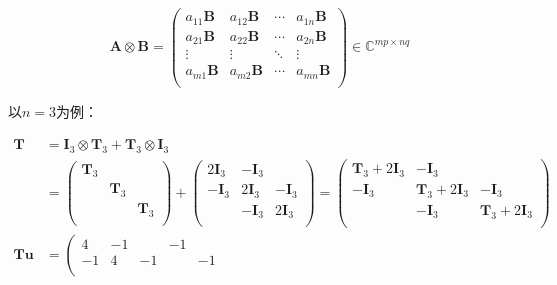 \documentclass[12pt, UTF8, nofonts]{ctexart}
\begin{document}
\[
    \boldsymbol{A} \otimes \boldsymbol{B} =
    \begin{pmatrix}
        a_{11}\boldsymbol{B} & a_{12}\boldsymbol{B} & \cdots & a_{1n}\boldsymbol{B} \\
        a_{21}\boldsymbol{B} & a_{22}\boldsymbol{B} & \cdots &
        a_{2n}\boldsymbol{B} \\
        \vdots & \vdots & \ddots & \vdots \\
        a_{m1}\boldsymbol{B} & a_{m2}\boldsymbol{B} & \cdots &
        a_{mn}\boldsymbol{B} \\
    \end{pmatrix} \in \mathbb{C}^{mp \times nq}
\]

以$n=3$为例：

\begin{equation*}
    \begin{aligned}
        \boldsymbol{T} &= \boldsymbol{I}_3 \otimes \boldsymbol{T}_3 +
        \boldsymbol{T}_3 \otimes \boldsymbol{I}_3 \\
        &= \begin{pmatrix}
            \boldsymbol{T}_3 & & \\ & \boldsymbol{T}_3 & \\
            & & \boldsymbol{T}_3 \\
        \end{pmatrix} +
        \begin{pmatrix}
            2\boldsymbol{I}_3 & -\boldsymbol{I}_3 & \\
            -\boldsymbol{I}_3 & 2\boldsymbol{I}_3 & -\boldsymbol{I}_3 \\
            & -\boldsymbol{I}_3 & 2\boldsymbol{I}_3 \\
        \end{pmatrix} =
        \begin{pmatrix}
            \boldsymbol{T}_3+2\boldsymbol{I}_3 & -\boldsymbol{I}_3 & \\
            -\boldsymbol{I}_3 & \boldsymbol{T}_3+2\boldsymbol{I}_3 &
            -\boldsymbol{I}_3 \\
            & -\boldsymbol{I}_3 & \boldsymbol{T}_3+2\boldsymbol{I}_3 \\
        \end{pmatrix} \\
        \boldsymbol{T}\boldsymbol{u} &=
        \left(
            \begin{array}{ccc|ccc|ccc}
                4 & -1 & & -1 & & & & & \\
                -1 & 4 & -1 & & -1 & & & & \\

\end{array}
\end{aligned}
\end{equation*}
\end{document}
